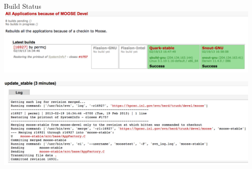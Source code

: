 \documentclass[mathserif]{beamer}
\begin{document}
\begin{frame}{Build Status}
  \includegraphics[width=\textwidth]{buildstatus_top}
  \\
  \vspace{.01\textheight}
  \begin{center}
    \includegraphics[width=\textwidth]{updatestable_log}
  \end{center}
\end{frame}
\end{document}
